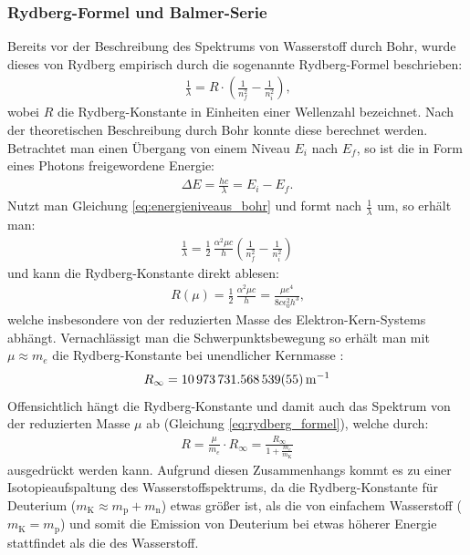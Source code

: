 \documentclass[11pt, a4paper]{article}
\numberwithin{equation}{section}
\begin{document}
\subsubsection{Rydberg-Formel und Balmer-Serie}
Bereits vor der Beschreibung des Spektrums von Wasserstoff durch Bohr, wurde dieses von Rydberg empirisch durch die sogenannte Rydberg-Formel beschrieben:
\begin{align}
	\label{eq:rydberg_formel}
	\frac{1}{\lambda} = R \cdot \left( \frac{1}{n_f^2} - \frac{1}{n_i^2} \right) \text{,}
\end{align}
wobei $R$ die Rydberg-Konstante in Einheiten einer Wellenzahl bezeichnet.
Nach der theoretischen Beschreibung durch Bohr konnte diese berechnet werden.
Betrachtet man einen Übergang von einem Niveau $E_i$ nach $E_f$, so ist die in Form eines Photons freigewordene Energie:
\begin{align}
	\Delta E = \frac{h c}{\lambda} = E_i - E_f \text{.}
\end{align}
Nutzt man Gleichung \ref{eq:energieniveaus_bohr} und formt nach $\frac{1}{\lambda}$ um, so erhält man:
\begin{align}
	\frac{1}{\lambda} = \frac{1}{2} \, \frac{\alpha^2 \mu c}{h} \left( \frac{1}{n_f^2} - \frac{1}{n_i^2}\right)
\end{align}
und kann die Rydberg-Konstante direkt ablesen:
\begin{align}
\label{eq:rydberg_konstante}
R(\mu) = \frac{1}{2} \, \frac{\alpha^2 \mu c}{h} = \frac{\mu e^4}{8 c \epsilon_0^2 h^3} \text{,}
\end{align}
welche insbesondere von der reduzierten Masse des Elektron-Kern-Systems abhängt.
Vernachlässigt man die Schwerpunktsbewegung so erhält man mit $\mu \approx m_e$ die Rydberg-Konstante bei unendlicher Kernmasse \cite{CODATA}:
\begin{align}
	R_\infty = \SI{10973731.568539 +- 0.000055}{\per\metre}
\end{align}
Offensichtlich hängt die Rydberg-Konstante und damit auch das Spektrum von der reduzierten Masse $\mu$ ab (Gleichung \ref{eq:rydberg_formel}), welche durch:
\begin{align}
	R = \frac{\mu}{m_e} \cdot R_\infty = \frac{R_\infty}{1 + \frac{m_e}{m_\mathrm{K}}}
\end{align}
ausgedrückt werden kann.
Aufgrund diesen Zusammenhangs kommt es zu einer Isotopieaufspaltung des Wasserstoffspektrums, da die Rydberg-Konstante für Deuterium ($m_\mathrm{K} \approx m_\mathrm{p} + m_\mathrm{n}$) etwas größer ist, als die von einfachem Wasserstoff ($m_\mathrm{K} = m_\mathrm{p}$) und somit die Emission von Deuterium bei etwas höherer Energie stattfindet als die des Wasserstoff.
\end{document}
